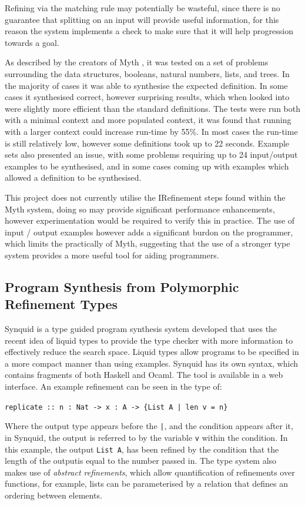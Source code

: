 \documentclass[a4paper]{article}
\begin{document}
Refining via the matching rule may potentially be wasteful, since there is no guarantee that splitting on an input will
provide useful information, for this reason the system implements a check to make sure that 
it will help progression towards a goal. 

As described by the creators of Myth \cite{10.1145/2813885.2738007}, it was tested on a set of problems surrounding the data structures, booleans, natural numbers, lists, and trees. In the majority of 
cases it was able to synthesise the expected definition. In some cases it synthesised correct, however surprising results, which 
when looked into were slightly more efficient than the standard definitions. The tests were run both with a minimal context and 
more populated context, it was found that running with a larger context could increase run-time by 55\%. In most cases the run-time 
is still relatively low, however some definitions took up to 22 seconds. Example sets also presented an issue, with some 
problems requiring up to 24 input/output examples to be synthesised, and in some cases coming up with examples which allowed a definition to be synthesised. 

This project does not currently utilise the IRefinement steps found
within the Myth system, doing so may provide significant performance
enhancements, however experimentation would be required to verify this
in practice. The use of input / output examples however adds a
significant burdon on the programmer, which limits the practically of
Myth, suggesting that the use of a stronger type system provides a
more useful tool for aiding programmers.

\subsection{Program Synthesis from Polymorphic Refinement Types}
\label{sec:org9b52768}
Synquid is a type guided program synthesis system developed that uses the recent idea of liquid types to provide the 
type checker with more information to effectively reduce the search space.
Liquid types allow programs to be specified in a more compact manner than using examples. Synquid has
its own syntax, which contains fragments of both Haskell and Ocaml. The tool is available in a web interface. An example refinement can be seen in the type of:

\texttt{replicate :: n : Nat -> x : A -> \{List A | len v = n\}}

Where the output type appears before the \texttt{|}, and the condition appears after it, in Synquid, the output is referred to by the variable \texttt{v} within the condition. In this example, the output \texttt{List A}, has been refined by the condition that the length of the outputis equal to the number passed in.
The type system also makes use of \emph{abstract refinements}, which allow quantification of refinements over functions, for
example, lists can be parameterised by a relation that defines an ordering between elements. 
\end{document}
